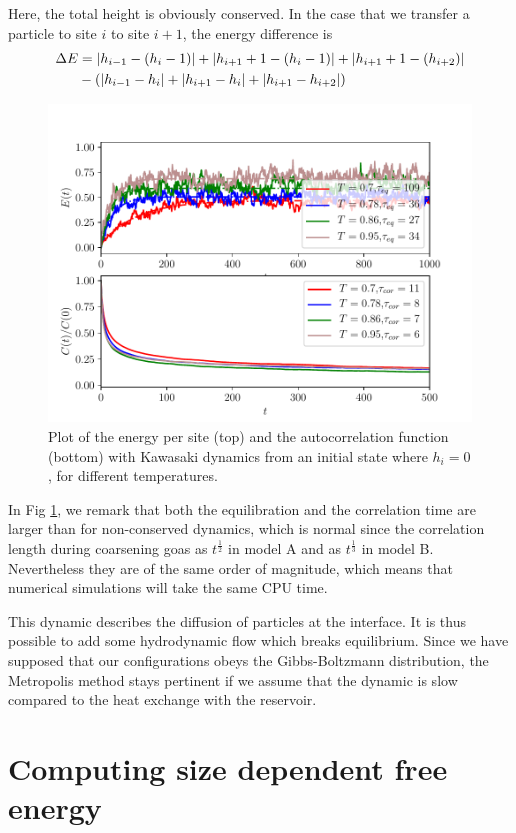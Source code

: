 Here, the total height is obviously conserved. In the case that we transfer a particle to site $i$ to site $i+1$, the energy difference is
\begin{align}
\Delta E &= |h_{i-1}-(h_i - 1)| + |h_{i+1} + 1 -(h_i- 1)| + |h_{i+1} + 1-(h_{i+2} )| \nonumber \\
& - \left( |h_{i-1}-h_i| + |h_{i+1} -h_i| + |h_{i+1}-h_{i+2}| \right)
\end{align}

\begin{figure}[t]
\centering
\includegraphics[scale=1]{numerical/sos-kaw-eq-cor.pdf}
\caption{Plot of the energy per site (top) and the autocorrelation function (bottom) with Kawasaki dynamics from an initial state where $h_i=0$, for different temperatures.}
\label{eq-kaw}
\end{figure}
In Fig \ref{eq-kaw}, we remark that both the equilibration and the correlation time are larger than for non-conserved dynamics, which is normal since the correlation length during coarsening goas as $t^\frac{1}{2}$ in model A and as $t^\frac{1}{3}$ in model B. Nevertheless they are of the same order of magnitude, which means that numerical simulations will take the same CPU time.

This dynamic describes the diffusion of particles at the interface. It is thus possible to add some hydrodynamic flow which breaks equilibrium. Since we have supposed that our configurations obeys the Gibbs-Boltzmann distribution, the Metropolis method stays pertinent if we assume that the dynamic is slow compared to the heat exchange with the reservoir.

\section{Computing size dependent free energy}

